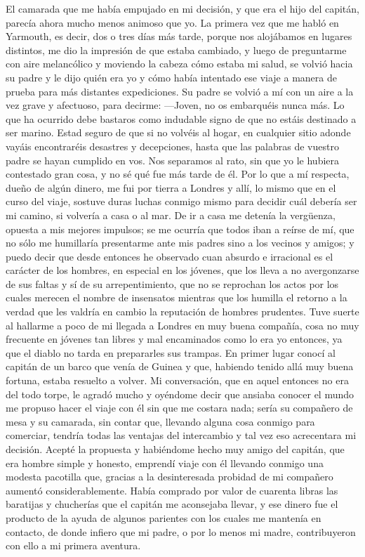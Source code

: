 \documentclass{novela}
\begin{document}
    El camarada que me había empujado en mi decisión, y que era el hijo del capitán, parecía ahora mucho menos animoso que yo. La primera vez que me habló en Yarmouth, es decir, dos o tres días más tarde, porque nos alojábamos en lugares distintos, me dio la impresión de que estaba cambiado, y luego de preguntarme con aire melancólico y moviendo la cabeza cómo estaba mi salud, se volvió hacia su padre y le dijo quién era yo y cómo había intentado ese viaje a manera de prueba para más distantes expediciones. Su padre se volvió a mí con un aire a la vez grave y afectuoso, para decirme:
    —Joven, no os embarquéis nunca más. Lo que ha ocurrido debe bastaros como indudable signo de que no estáis destinado a ser marino. Estad seguro de que si no volvéis al hogar, en cualquier sitio adonde vayáis encontraréis desastres y decepciones, hasta que las palabras de vuestro padre se hayan cumplido en vos.
    Nos separamos al rato, sin que yo le hubiera contestado gran cosa, y no sé qué fue más tarde de él. Por lo que a mí respecta, dueño de algún dinero, me fui por tierra a Londres y allí, lo mismo que en el curso del viaje, sostuve duras luchas conmigo mismo para decidir cuál debería ser mi camino, si volvería a casa o al mar. De ir a casa me detenía la vergüenza, opuesta a mis mejores impulsos; se me ocurría que todos iban a reírse de mí, que no sólo me humillaría presentarme ante mis padres sino a los vecinos y amigos; y puedo decir que desde entonces he observado cuan absurdo e irracional es el carácter de los hombres, en especial en los jóvenes, que los lleva a no avergonzarse de sus faltas y sí de su arrepentimiento, que no se reprochan los actos por los cuales merecen el nombre de insensatos mientras que los humilla el retorno a la verdad que les valdría en cambio la reputación de hombres prudentes.
    Tuve suerte al hallarme a poco de mi llegada a Londres en muy buena compañía, cosa no muy frecuente en jóvenes tan libres y mal encaminados como lo era yo entonces, ya que el diablo no tarda en prepararles sus trampas. En primer lugar conocí al capitán de un barco que venía de Guinea y que, habiendo tenido allá muy buena fortuna, estaba resuelto a volver. Mi conversación, que en aquel entonces no era del todo torpe, le agradó mucho y oyéndome decir que ansiaba conocer el mundo me propuso hacer el viaje con él sin que me costara nada; sería su compañero de mesa y su camarada, sin contar que, llevando alguna cosa conmigo para comerciar, tendría todas las ventajas del intercambio y tal vez eso acrecentara mi decisión.
    Acepté la propuesta y habiéndome hecho muy amigo del capitán, que era hombre simple y honesto, emprendí viaje con él llevando conmigo una modesta pacotilla que, gracias a la desinteresada probidad de mi compañero aumentó considerablemente. Había comprado por valor de cuarenta libras las baratijas y chucherías que el capitán me aconsejaba llevar, y ese dinero fue el producto de la ayuda de algunos parientes con los cuales me mantenía en contacto, de donde infiero que mi padre, o por lo menos mi madre, contribuyeron con ello a mi primera aventura.
\end{document}
